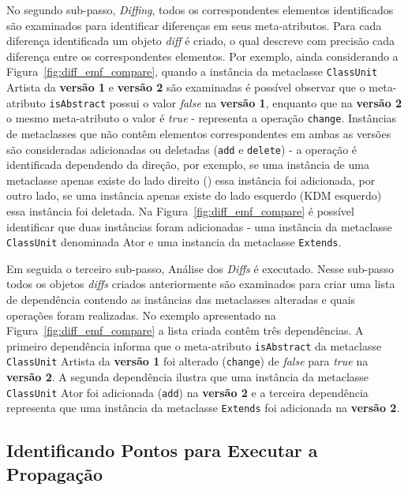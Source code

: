 No segundo sub-passo, \textit{Diffing}, todos os correspondentes elementos identificados são examinados para identificar diferenças em seus meta-atributos. Para cada diferença identificada um objeto \textit{diff} é criado, o qual descreve com precisão cada diferença entre os correspondentes elementos. Por exemplo, ainda considerando a Figura~\ref{fig:diff_emf_compare}, quando a instância da metaclasse \texttt{ClassUnit} Artista da \textbf{versão 1} e \textbf{versão 2} são examinadas é possível observar que o meta-atributo \texttt{isAbstract} possui o valor \textit{false} na \textbf{versão 1}, enquanto que na \textbf{versão 2} o mesmo meta-atributo o valor é \textit{true} - representa a operação \texttt{change}. Instâncias de metaclasses que não contêm elementos correspondentes em ambas as versões são consideradas adicionadas ou deletadas (\texttt{add} e \texttt{delete}) - a operação é identificada dependendo da direção, por exemplo, se uma instância de uma metaclasse apenas existe do lado direito () essa instância foi adicionada, por outro lado, se uma instância apenas existe do lado esquerdo (KDM esquerdo) essa instância foi deletada. Na Figura~\ref{fig:diff_emf_compare} é possível identificar que duas instâncias foram adicionadas - uma instância da metaclasse \texttt{ClassUnit} denominada Ator e uma instancia da metaclasse \texttt{Extends}.

Em seguida o terceiro sub-passo, Análise dos \textit{Diffs} é executado. Nesse sub-passo todos os objetos \textit{diffs} criados anteriormente são examinados para criar uma lista de dependência contendo as instâncias das metaclasses alteradas e quais operações foram realizadas. No exemplo apresentado na Figura~\ref{fig:diff_emf_compare} a lista criada contêm três dependências. A primeiro dependência informa que o meta-atributo \texttt{isAbstract} da metaclasse \texttt{ClassUnit} Artista da \textbf{versão 1} foi alterado (\texttt{change}) de \textit{false} para \textit{true} na \textbf{versão 2}. A segunda dependência ilustra que uma instância da metaclasse \texttt{ClassUnit} Ator foi adicionada (\texttt{add}) na \textbf{versão 2} e a terceira dependência representa que uma instância da metaclasse \texttt{Extends} foi adicionada na \textbf{versão 2}.


\subsection{Identificando Pontos para Executar a Propagação}

